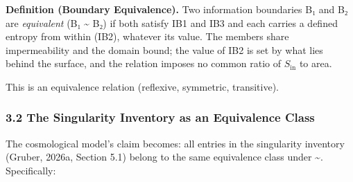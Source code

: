 \documentclass[
]{article}
\begin{document}
\textbf{Definition (Boundary Equivalence).} Two information boundaries
B₁ and B₂ are \emph{equivalent} (B₁ \textasciitilde{} B₂) if both
satisfy IB1 and IB3 and each carries a defined entropy from within
(IB2), whatever its value. The members share impermeability and the
domain bound; the value of IB2 is set by what lies behind the surface,
and the relation imposes no common ratio of \(S_{\mathrm{in}}\) to area.

This is an equivalence relation (reflexive, symmetric, transitive).

\hypertarget{the-singularity-inventory-as-an-equivalence-class}{%
\subsubsection{3.2 The Singularity Inventory as an Equivalence
Class}\label{the-singularity-inventory-as-an-equivalence-class}}

The cosmological model's claim becomes: all entries in the singularity
inventory (Gruber, 2026a, Section 5.1) belong to the same equivalence
class under \textasciitilde. Specifically:
\end{document}
